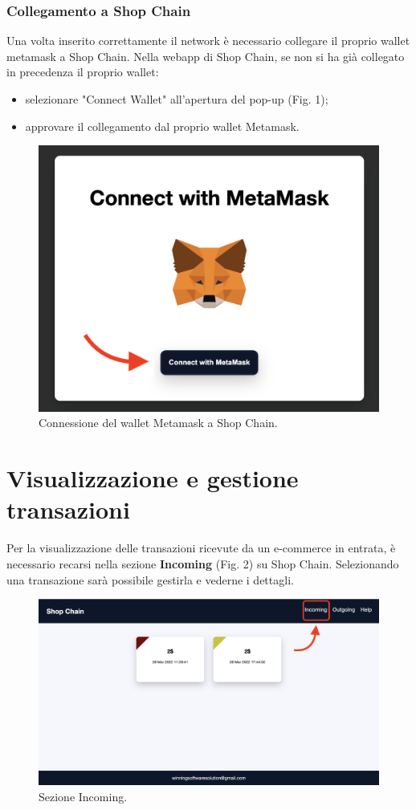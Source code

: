 \documentclass[a4paper, 12pt]{article}
\begin{document}
\subsubsection{Collegamento a Shop Chain}
Una volta inserito correttamente il network è necessario collegare il proprio wallet metamask a Shop Chain. Nella webapp di Shop Chain, se non si ha già collegato in precedenza il proprio wallet:
\begin {itemize}
\item selezionare "Connect Wallet" all'apertura del pop-up (Fig. 1);
\item approvare il collegamento dal proprio wallet Metamask.
\end{itemize}

\FloatBarrier
\begin{figure}[!h]
\centering
\includegraphics[width=0.5\linewidth]{img/connessione_wallet.png}
\caption{Connessione del wallet Metamask a Shop Chain.}
\end{figure}
\FloatBarrier
\section{Visualizzazione e gestione transazioni}
Per la visualizzazione delle transazioni ricevute da un e-commerce in entrata, è necessario recarsi nella sezione \textbf{Incoming} (Fig. 2) su Shop Chain. Selezionando una transazione sarà possibile gestirla e vederne i dettagli.
\FloatBarrier
\begin{figure}[!h]
\centering
\includegraphics[width=0.8\linewidth]{img/incoming.png}
\caption{Sezione Incoming.}
\end{figure}
\FloatBarrier
\end{document}
